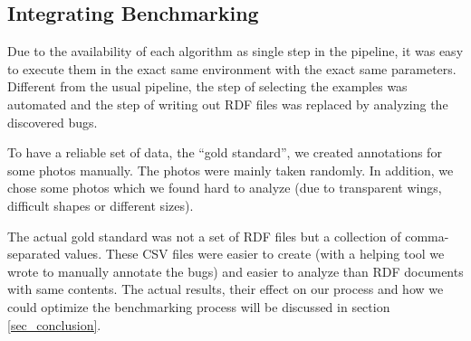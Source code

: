 \subsection{Integrating Benchmarking}
Due to the availability of each algorithm as single step in the pipeline, it was easy to execute them in the exact same environment with the exact same parameters. 
Different from the usual pipeline, the step of selecting the examples was automated and the step of writing out RDF files was replaced by analyzing the discovered bugs.

To have a reliable set of data, the ``gold standard'', we created annotations for some photos manually. 
The photos were mainly taken randomly.
In addition, we chose some photos which we found hard to analyze (due to transparent wings, difficult shapes or different sizes).

The actual gold standard was not a set of RDF files but a collection of comma-separated values. 
These CSV files were easier to create (with a helping tool we wrote to manually annotate the bugs) and easier to analyze than RDF documents with same contents.
The actual results, their effect on our process and how we could optimize the benchmarking process will be discussed in section \ref{sec_conclusion}.